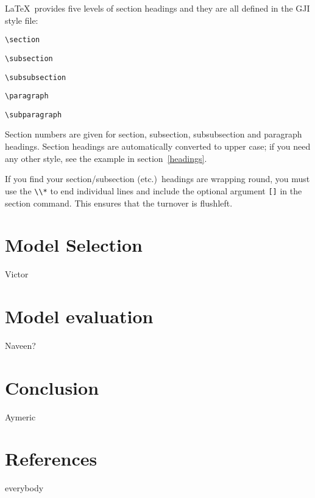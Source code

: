 \documentclass{gji}
\begin{document}
\LaTeX\ provides five levels of section headings and they are all
defined in the GJI style file:
\begin{description}
  \item \verb"\section"
  \item \verb"\subsection"
  \item \verb"\subsubsection"
  \item \verb"\paragraph"
  \item \verb"\subparagraph"
\end{description}
Section numbers are given for section, subsection, subsubsection
and paragraph headings.  Section headings are automatically converted to
upper case; if you need any other style, see the example in section~\ref{headings}.

If you find your section/subsection (etc.)\ headings are wrapping round,
you must use the \verb"\\*" to end individual lines and include the
optional argument \verb"[]" in the section command. This ensures that
the turnover is flushleft.

\section{Model Selection}

Victor 

\section{Model evaluation}
Naveen?

\section{Conclusion}

Aymeric

\section{References}

everybody
\end{document}
